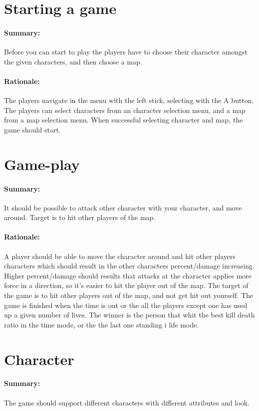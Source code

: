 \section{Starting a game}
	\paragraph{Summary:}
		Before you can start to play the players have to choose their character amongst the given characters, and then choose a map.
	\paragraph{Rationale:}
		The players navigate in the menu with the left stick, selecting with the A button.
		The players can select characters from an character selection menu, and a map from a map selection menu.
		When successful selecting character and map, the game should start. 

\section{Game-play}
	\paragraph{Summary:}
		It should be possible to attack other character with your character, and move around.
		Target is to hit other players of the map.
	\paragraph{Rationale:}
		A player should be able to move the character around and hit other players characters which should result in the other characters percent/damage increasing. 
		Higher percent/damage should results that attacks at the character applies more force in a direction, so it's easier to hit the player out of the map. 
		The target of the game is to hit other players out of the map, and not get hit out yourself. The game is finished when the time is out or the all the players except one has used up a given number of lives.
		The winner is the person that whit the best kill death ratio in the time mode, or the the last one standing i life mode.

\section{Character}
	\paragraph{Summary:}
		The game should support different characters with different attributes and look. 
